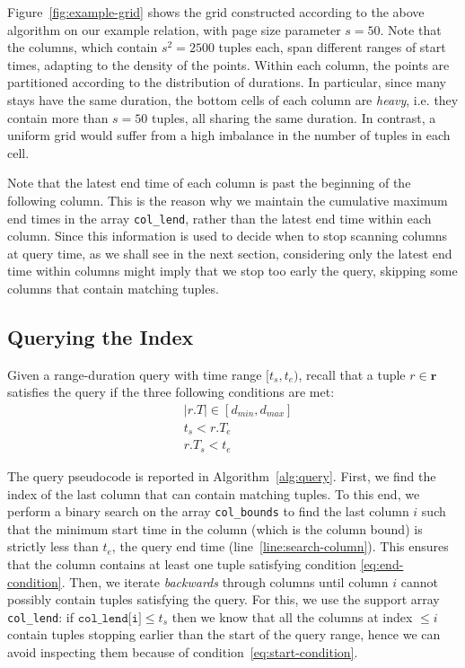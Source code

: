 \documentclass[sigconf,nonacm,anonymous]{acmart}
\theoremstyle{definition}
\newcommand{\R}{\ensuremath{\mathbf{r}}\xspace} %
\newcommand{\TS}{\ensuremath{t_s}}
\newcommand{\TE}{\ensuremath{t_e}}
\newcommand{\rTE}{\ensuremath{r.T_e}}
\newcommand{\rTS}{\ensuremath{r.T_s}}
\newcommand{\dmin}{\ensuremath{d_{min}}}
\newcommand{\dmax}{\ensuremath{d_{max}}}
\newcommand{\rT}{\ensuremath{r.T}}
\newcommand{\Colbounds}{\texttt{col\_bounds}\xspace}
\newcommand{\LatestEnds}{\texttt{col\_lend}\xspace}
\newcommand{\LatestEndsi}{\texttt{col\_lend[i]}\xspace}
\begin{document}
\begin{example}
  Figure~\ref{fig:example-grid} shows the grid constructed according to the above
  algorithm on our example relation, with page size parameter $s=50$. Note that the columns, which contain $s^2=2500$ tuples each, span different ranges of
  start times, adapting to the density of the points.
  Within each column, the points are partitioned according to the distribution of durations.
  In particular, since many stays have the same duration, the bottom cells of each column are \emph{heavy}, i.e. they contain more than $s=50$ tuples, all sharing the same duration.
  In contrast, a uniform grid would suffer from a high imbalance in the number of
  tuples in each cell.

  Note that the latest end time of each column is past the beginning of the following column.
  This is the reason why we maintain the cumulative maximum end times in the array \LatestEnds, rather than the latest end time within each column.
  Since this information is used to decide when to stop scanning columns at query time, as we shall see in the next section, considering only the latest end time within columns might imply that we stop too early the query, skipping some columns that contain matching tuples.
\end{example}

\subsection{Querying the Index}

Given a range-duration query with time range $[\TS, \TE)$, 
recall that a tuple $r \in \R$
satisfies the query if the three following conditions are met:
\begin{align}
	 & |\rT| \in [\dmin, \dmax] \label{eq:duration-condition} \\
	 & \TS < \rTE                  \label{eq:start-condition}     \\
	 & \rTS < \TE                  \label{eq:end-condition}
\end{align}

The query pseudocode is reported in Algorithm~\ref{alg:query}.
First, we find the index of the last column that can contain matching
tuples.
To this end, we perform a binary search on the array \Colbounds to find
the last column $i$ such that the minimum start time in the column (which is the column bound) is strictly less than \TE, the query end time (line~\ref{line:search-column}).
This ensures that the column contains at least one tuple satisfying
condition \eqref{eq:end-condition}.
Then, we iterate \emph{backwards} through columns until column $i$
cannot possibly contain tuples satisfying the query.
For this, we use the support array \LatestEnds: if
$\LatestEndsi \le \TS$ then we know that all the columns at index $\le i$
contain tuples stopping earlier than the start of the query range,
hence we can avoid inspecting them because of condition~\eqref{eq:start-condition}.
\end{document}
